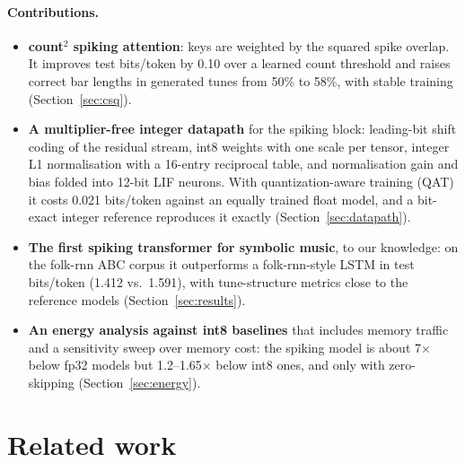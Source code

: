 \documentclass[10pt]{article}
\newcommand{\csq}{count$^2$}
\begin{document}
\paragraph{Contributions.}
\begin{itemize}
  \item \textbf{\csq{} spiking attention}: keys are weighted by the squared spike overlap. It improves test
        bits/token by 0.10 over a learned count threshold and raises correct bar lengths in generated tunes from
        50\% to 58\%, with stable training (Section~\ref{sec:csq}).
  \item \textbf{A multiplier-free integer datapath} for the spiking block: leading-bit shift coding of the
        residual stream, int8 weights with one scale per tensor, integer L1 normalisation with a 16-entry
        reciprocal table, and normalisation gain and bias folded into 12-bit LIF neurons. With quantization-aware
        training (QAT) it costs 0.021 bits/token against an equally trained float model, and a bit-exact integer
        reference reproduces it exactly (Section~\ref{sec:datapath}).
  \item \textbf{The first spiking transformer for symbolic music}, to our knowledge: on the folk-rnn ABC corpus
        it outperforms a folk-rnn-style LSTM in test bits/token (1.412 vs.\ 1.591), with tune-structure metrics
        close to the reference models (Section~\ref{sec:results}).
  \item \textbf{An energy analysis against int8 baselines} that includes memory traffic and a sensitivity sweep
        over memory cost: the spiking model is about 7$\times$ below fp32 models but 1.2--1.65$\times$ below int8
        ones, and only with zero-skipping (Section~\ref{sec:energy}).
\end{itemize}

\section{Related work}
\end{document}
